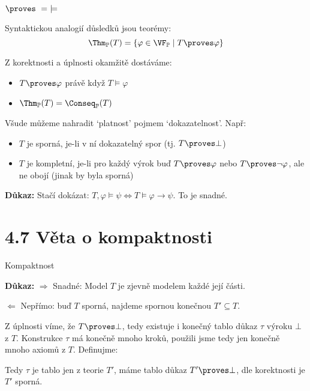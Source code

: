 \documentclass{beamer}
\begin{document}
\begin{frame}{$\proves\ =\ \models$}

    \pause
    Syntaktickou analogií \alert{důsledků} jsou \alert{teorémy}:
    $$\Thm_\mathbb P(T)=\{\varphi\in\VF_\mathbb P\mid T\proves\varphi\}$$
    
    \pause
    Z korektnosti a úplnosti okamžitě dostáváme:
        \begin{itemize}
            \item $T\proves\varphi$ právě když $T\models\varphi$
            \item $\Thm_\mathbb P(T)=\Conseq_\mathbb P(T)$
        \end{itemize}
    
        \pause
    Všude můžeme nahradit `\alert{platnost}' pojmem `\alert{dokazatelnost}'.  Např:\pause
    \begin{itemize}
        \item $T$ je \alert{sporná}, je-li v ní dokazatelný spor (tj. \alert{$T\proves\bot$})\pause
        \item $T$ je \alert{kompletní}, je-li pro každý výrok buď $T\proves\varphi$ nebo $T\proves\neg\varphi$, ale ne obojí (jinak by byla sporná)
    \end{itemize}

    \pause

    \pause
    \textbf{Důkaz:} Stačí dokázat: $T,\varphi\models\psi\Leftrightarrow T\models\varphi\to\psi$. To je snadné.\hfill\qedsymbol

\end{frame}


\section{4.7 Věta o kompaktnosti}


\begin{frame}{Kompaktnost}

    \smallskip

    \pause
    \textbf{Důkaz:} \pause \alert{$\Rightarrow$ Snadné:} Model $T$ je zjevně modelem každé její části.
    
    \pause
    \alert{$\Leftarrow$ Nepřímo:} buď $T$ sporná, najdeme spornou konečnou $T'\subseteq T$.

    \pause
    Z \alert{úplnosti} víme, že $T\proves\bot$, tedy existuje i \alert{konečný} tablo důkaz $\tau$ výroku $\bot$ z $T$. \pause Konstrukce $\tau$ má konečně mnoho kroků, použili jsme tedy jen konečně mnoho axiomů z $T$. \pause Definujme:
    
    \pause

    \pause
    Tedy $\tau$ je tablo jen z teorie $T'$, máme tablo důkaz $T'\proves\bot$, dle \alert{korektnosti} je $T'$ sporná.\hfill\qedsymbol

\end{frame}
\end{document}
